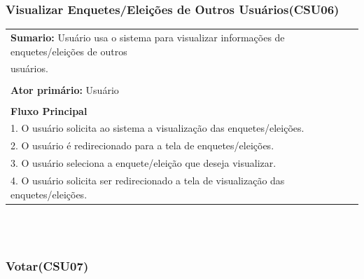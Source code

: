 \documentclass[a4paper,12pt]{article}
\begin{document}
\begin{center}
	{\subsubsection*{Visualizar Enquetes/Eleições de Outros Usuários(CSU06)}}
\end{center}
\markright{}
\begin{tabular}{|l|}\hline
	{\textbf{Sumario:}} Usuário usa o sistema para visualizar informações de enquetes/eleições de outros \hfill \\ usuários. \\\\
	{\textbf{Ator primário:}} Usuário \\\\
	{\textbf{Fluxo Principal}}\\
	1. O usuário solicita ao sistema a visualização das enquetes/eleições.\\
	2. O usuário é redirecionado para a tela de enquetes/eleições. \\
	3. O usuário seleciona a enquete/eleição que deseja visualizar. \\
	4. O usuário solicita ser redirecionado a tela de visualização das enquetes/eleições.\\
	\hline
\end{tabular}
\\\\
\begin{center}
	{\subsubsection*{Votar(CSU07)}}
\end{center}
\markright{}
\end{document}
